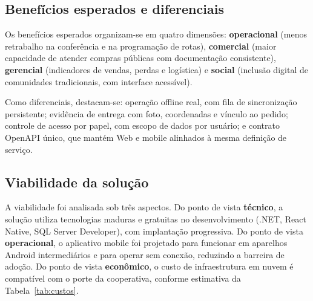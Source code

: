 \subsection{Benefícios esperados e diferenciais}

Os benefícios esperados organizam-se em quatro dimensões: \textbf{operacional}
(menos retrabalho na conferência e na programação de rotas), \textbf{comercial}
(maior capacidade de atender compras públicas com documentação consistente),
\textbf{gerencial} (indicadores de vendas, perdas e logística) e \textbf{social}
(inclusão digital de comunidades tradicionais, com interface acessível).

Como diferenciais, destacam-se: operação offline real, com fila de sincronização
persistente; evidência de entrega com foto, coordenadas e vínculo ao pedido;
controle de acesso por papel, com escopo de dados por usuário; e contrato OpenAPI
único, que mantém Web e mobile alinhados à mesma definição de serviço.

\subsection{Viabilidade da solução}

A viabilidade foi analisada sob três aspectos. Do ponto de vista
\textbf{técnico}, a solução utiliza tecnologias maduras e gratuitas no
desenvolvimento (.NET, React Native, SQL Server Developer), com implantação
progressiva. Do ponto de vista \textbf{operacional}, o aplicativo mobile foi
projetado para funcionar em aparelhos Android intermediários e para operar sem
conexão, reduzindo a barreira de adoção. Do ponto de vista \textbf{econômico}, o
custo de infraestrutura em nuvem é compatível com o porte da cooperativa,
conforme estimativa da Tabela~\ref{tab:custos}.

